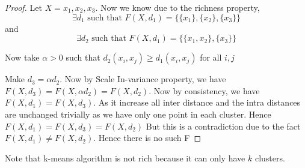 \begin{proof}

  Let $X = {x_1, x_2,x_3}$. Now we know due to the richness property,
  $$\exists d_1 \text{ such that } F(X,d_1) = \{\{x_1\},\{x_2\},\{x_3\}\}$$
  and 
  $$\exists d_2 \text{ such that } F(X,d_1) = \{\{x_1, x_2\},\{x_3\}\}$$

  Now take $\alpha > 0$ such that $d_2(x_i,x_j) \geq d_1(x_i,x_j)$ for all $i,j$

  Make $d_3 = \alpha d_2$. Now by Scale In-variance property, we have $F(X,d_3) = F(X, \alpha d_2) = F(X,d_2)$.
  Now by consistency, we have $F(X,d_1) = F(X, d_3)$. As it increase all inter distance and the intra distances are unchanged trivially as we have only one point in each cluster.
  Hence $F(X,d_1) = F(X,d_3) = F(X,d_2) $ But this is a contradiction due to the fact $F(X,d_1) \neq F(X,d_2) $. Hence there is no such F


  
  
  
\end{proof}
Note that k-means algorithm is not rich because it can only have
$k$ clusters. 
